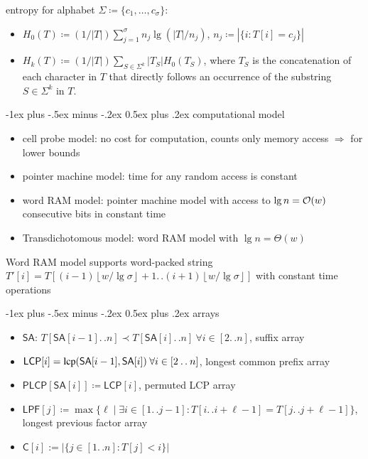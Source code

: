 \documentclass[10pt,landscape]{article}
\makeatletter
\renewcommand{\section}{\@startsection{section}{1}{0mm}%
                                {-1ex plus -.5ex minus -.2ex}%
                                {0.5ex plus .2ex}%
                                {\normalfont\large\itshape}}
\newcommand*{\UnaryOperator}[2][]{%
	\ifx&#1&%
	\ensuremath{\mathop{}\mathopen{}#2\mathopen{}}%
	\else%
	\ensuremath{\mathop{}\mathopen{}#2\mathopen{}\left(#1\right)}%
\fi%
}
\newcommand*{\Oh}[1]{\UnaryOperator[#1]{\mathcal{O}}}
\newcommand*{\Ot}[1]{\ensuremath{\Theta(#1)}}
\newcommand*{\IC}{\mathbin{{.}\,{.}}} %
\newcommand*{\gauss}[1]{\left\lfloor#1\right\rfloor} %
\newcommand*{\abs}[1]{\ensuremath{|#1|}} %
\newcommand*{\menge}[1]{\ensuremath{\{#1\}}} %
\newcommand*{\instancename}[1]{\ensuremath{\mathsf{#1}}} %
\newcommand*{\LPF} {\instancename{LPF}}
\newcommand*{\LCPA} {\instancename{LCP}}
\newcommand*{\PLCP}{\instancename{PLCP}}
\newcommand*{\SA}  {\instancename{SA}}
\newcommand*{\arrC}  {\instancename{C}}
\newcommand*{\textT}  {\ensuremath{T}}
\newcommand*{\textS}  {\ensuremath{S}}
\newcommand*{\functionname}[1]{{\ensuremath{\renewcommand{\rmdefault}{ptm}\fontfamily{ppl}\selectfont\textrm{\textup{#1}}}}} %
\newcommand*{\lcp}{\functionname{lcp}}
\makeatother
\begin{document}
\begin{multicols}{2}
entropy for alphabet $\Sigma \coloneqq \menge{c_1, \ldots, c_\sigma}$:
\begin{itemize}
	\item    $H_0(\textT) \coloneqq (1/|T|)\sum_{j=1}^{\sigma} n_j \lg(|T|/n_j)$, $n_j \coloneqq \abs{\menge{i : \textT[i] = c_j}}$
	\item    $H_k(\textT) \coloneqq (1/|T|) \sum_{\textS \in \Sigma^k} \abs{\textT_{\textS}} H_0(\textT_{\textS})$,
where $\textT_{\textS}$ is the concatenation of each character in $\textT$ that directly follows an occurrence of the substring~$\textS \in \Sigma^k$ in $\textT$.
\end{itemize}

\section{computational model}
\begin{itemize}
   \item cell probe model: no cost for computation, counts only memory access $\Rightarrow$ for lower bounds~\cite{yao81sorted}
   \item pointer machine model: time for any random access is constant
   \item word RAM model: pointer machine model with access to $\lg n = \Oh{w}$ consecutive bits in constant time~\cite{hagerup98sorting}
   \item Transdichotomous model: word RAM model with $\lg n = \Ot{w}$~\cite{fredman93fusion}
\end{itemize}
Word RAM model supports word-packed string $T'[i] = T[(i-1) \gauss{w / \lg\sigma}+1 \IC{} (i+1) \gauss{w/\lg\sigma}]$ with constant time operations


\section{arrays}
\begin{itemize}
	\item $\SA$: $\textT[\SA[i-1]\IC{}n] \prec \textT[\SA[i]\IC{}n]~\forall i \in [2\IC{}n]$, suffix array~\cite{manber93sa}
	\item $\LCPA[i] = \lcp(\SA[i-1], \SA[i])~\forall i \in [2\IC{}n]$, longest common prefix array
	\item $\PLCP[ {\SA[i]} ] \coloneqq \LCPA[i]$, permuted LCP array~\cite{kasai01lcp}
	\item $\LPF[j] \coloneqq \max\{\ell \mid \exists i \in [1\IC{}j-1] : \textT[i\IC{}i+\ell-1] = \textT[j\IC{}j+\ell-1]\}$, longest previous factor array~\cite{franek03lpf,crochemore08lpf}
	\item   $\arrC[i] := \abs{\menge{j \in [1\IC{}n] : \textT[j] < i}}$
\end{itemize}


\end{multicols}
\end{document}
